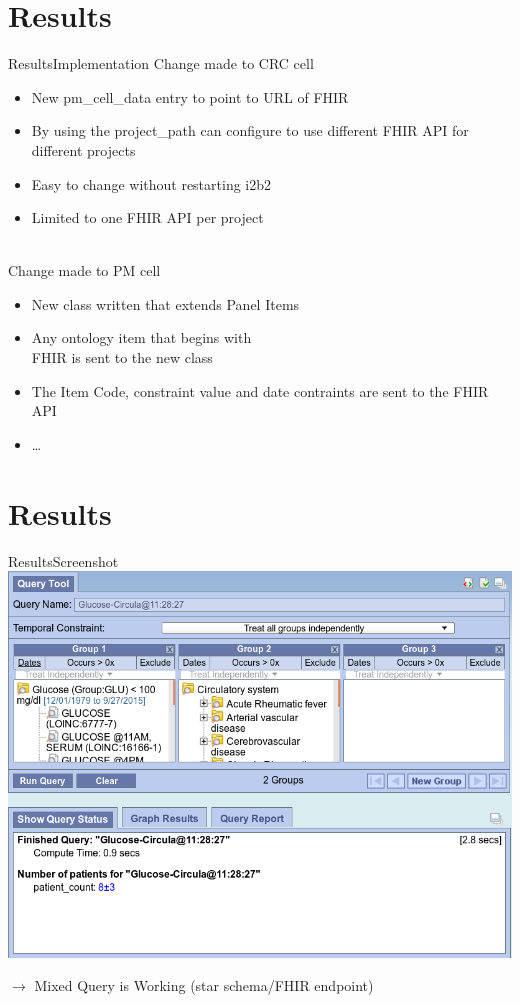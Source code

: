 \documentclass[10pt]{beamer}
\begin{document}
\section{Results}
\begin{frame}{Results}{Implementation}
	Change made to CRC cell
\begin{itemize}
\item New	pm\_cell\_data entry	to	point	to	URL of FHIR
\item By	using	the	project\_path can	configure	to	use	 different	FHIR	API	for	different	projects
\item Easy	to	change	without	restarting	i2b2
\item Limited	to	one	FHIR	API	per	project
\end{itemize}
~
\\
	Change made to PM cell
\begin{itemize}
\item New class written	that extends	Panel Items
\item Any ontology item that begins with \\FHIR is sent to the new class
\item The	Item	Code,	constraint	value	and	date	contraints are	sent	to	the	FHIR	API
\item \ldots
\end{itemize}
\end{frame}

\section{Results}
\begin{frame}{Results}{Screenshot}
\includegraphics[height=.7\textheight]{images/demo.png}

	$\rightarrow$ Mixed Query is Working (star schema/FHIR endpoint)
\end{frame}
\end{document}
